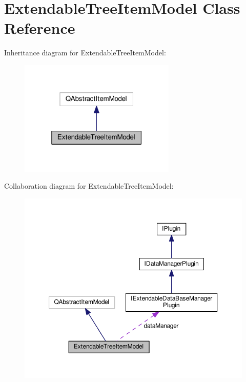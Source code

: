 \hypertarget{class_extendable_tree_item_model}{}\section{Extendable\+Tree\+Item\+Model Class Reference}
\label{class_extendable_tree_item_model}


Inheritance diagram for Extendable\+Tree\+Item\+Model\+:\nopagebreak
\begin{figure}[H]
\begin{center}
\leavevmode
\includegraphics[width=211pt]{class_extendable_tree_item_model__inherit__graph}
\end{center}
\end{figure}


Collaboration diagram for Extendable\+Tree\+Item\+Model\+:\nopagebreak
\begin{figure}[H]
\begin{center}
\leavevmode
\includegraphics[width=350pt]{class_extendable_tree_item_model__coll__graph}
\end{center}
\end{figure}
